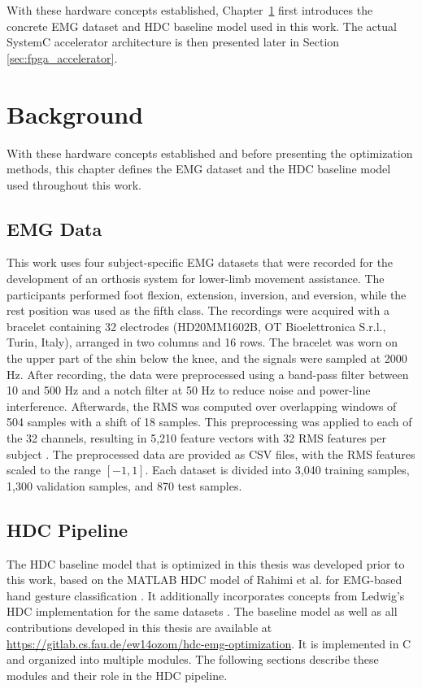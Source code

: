         With these hardware concepts established, Chapter~\ref{sec:background} first introduces the concrete EMG dataset and HDC baseline model used in this work. The actual SystemC accelerator architecture is then presented later in Section \ref{sec:fpga_accelerator}.





   

\chapter{Background}
\label{sec:background}
With these hardware concepts established and before presenting the optimization methods, this chapter defines the EMG dataset and the HDC baseline model used throughout this work.

    \section{EMG Data}
    \label{sec:emg-preprocessing}

    This work uses four subject-specific EMG datasets that were recorded for the development of an orthosis system for lower-limb movement assistance. The participants performed foot flexion, extension, inversion, and eversion, while the rest position was used as the fifth class. The recordings were acquired with a bracelet containing 32 electrodes (HD20MM1602B, OT Bioelettronica S.r.l., Turin, Italy), arranged in two columns and 16 rows. The bracelet was worn on the upper part of the shin below the knee, and the signals were sampled at 2000 Hz.
    After recording, the data were preprocessed using a band-pass filter between 10 and 500 Hz and a notch filter at 50 Hz to reduce noise and power-line interference. Afterwards, the \ac{RMS} was computed over overlapping windows of 504 samples with a shift of 18 samples. This preprocessing was applied to each of the 32 channels, resulting in 5,210 feature vectors with 32 RMS features per subject \cite{ledwig_vdl-implementierung_2025, cnejevici_closed-loop_2026}. The preprocessed data are provided as CSV files, with the \ac{RMS} features scaled to the range $[-1,1]$. Each dataset is divided into 3,040 training samples, 1,300 validation samples, and 870 test samples.
    
    \section{HDC Pipeline}
    The HDC baseline model that is optimized in this thesis was developed prior to this work, based on the MATLAB HDC model of Rahimi et al. for EMG-based hand gesture classification \cite{rahimi_hyperdimensional_2016}. It additionally incorporates concepts from Ledwig's HDC implementation for the same datasets \cite{ledwig_vdl-implementierung_2025}. The baseline model as well as all contributions developed in this thesis are available at \url{https://gitlab.cs.fau.de/ew14ozom/hdc-emg-optimization}. It is implemented in C and organized into multiple modules. The following sections describe these modules and their role in the HDC pipeline.
